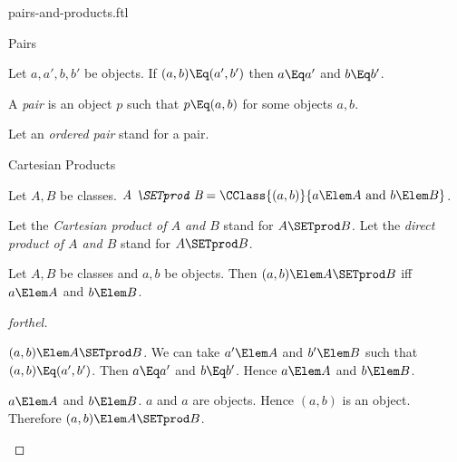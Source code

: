 \documentclass{stex}
\begin{document}
\begin{smodule}{pairs-and-products.ftl}

\begin{sfragment}{Pairs}
  \begin{axiom}[forthel,id=FOUNDATIONS_04_8464577431863296]
    Let $a, a', b, b'$ be objects.
    If $(a, b) \Eq (a', b')$ then $a \Eq a'$ and $b \Eq b'$.
  \end{axiom}

  \begin{definition}[forthel,id=FOUNDATIONS_04_4782386822774784]
    A \emph{pair} is an object $p$ such that $p \Eq (a, b)$ for some objects $a, b$.

    Let an \emph{ordered pair} stand for a pair.
  \end{definition}
\end{sfragment}

\begin{sfragment}{Cartesian Products}
  \begin{definition}[forthel,id=FOUNDATIONS_04_2877806274936832]
    Let $A, B$ be classes.
    $\emph{A \SETprod B} = \CClass{(a, b)}{a \Elem A\text{ and }b \Elem B}$.

    Let the \emph{Cartesian product of $A$ and $B$} stand for $A \SETprod B$.
    Let the \emph{direct product of $A$ and $B$} stand for $A \SETprod B$.
  \end{definition}

  \begin{proposition}[forthel,id=FOUNDATIONS_04_1581118511906816]
    Let $A, B$ be classes and $a, b$ be objects.
    Then $(a, b) \Elem A \SETprod B$ iff $a \Elem A$ and $b \Elem B$.
  \end{proposition}
  \begin{proof}[forthel]
    \begin{case}{$(a, b) \Elem A \SETprod B$.}
      We can take $a' \Elem A$ and $b' \Elem B$ such that $(a, b) \Eq (a', b')$.
      Then $a \Eq a'$ and $b \Eq b'$.
      Hence $a \Elem A$ and $b \Elem B$.
    \end{case}

    \begin{case}{$a \Elem A$ and $b \Elem B$.}
      $a$ and $a$ are objects.
      Hence $(a, b)$ is an object.
      Therefore $(a, b) \Elem A \SETprod B$.
    \end{case}
  \end{proof}


\end{sfragment}
\end{smodule}
\end{document}
